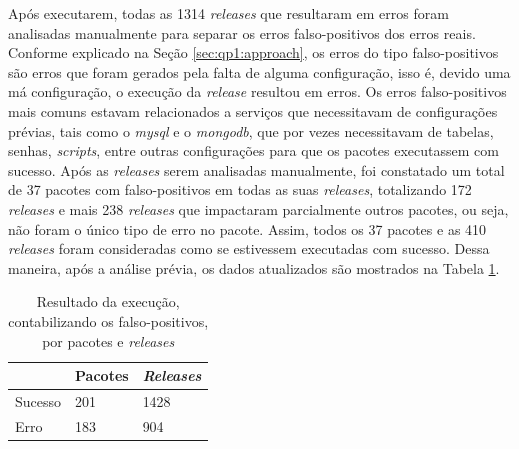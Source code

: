 Após executarem, todas as 1314 \textit{releases} que resultaram em erros foram analisadas manualmente para separar os erros falso-positivos dos erros reais. Conforme explicado na Seção \ref{sec:qp1:approach}, os erros do tipo falso-positivos são erros que foram gerados pela falta de alguma configuração, isso é, devido uma má configuração, o execução da \textit{release} resultou em erros. Os erros falso-positivos mais comuns estavam relacionados a serviços que necessitavam de configurações prévias, tais como o \textit{mysql} e o \textit{mongodb}, que por vezes necessitavam de tabelas, senhas, \textit{scripts}, entre outras configurações para que os pacotes executassem com sucesso. Após as \textit{releases} serem analisadas manualmente, foi constatado um total de 37 pacotes com falso-positivos em todas as suas \textit{releases}, totalizando 172 \textit{releases} e mais 238 \textit{releases} que impactaram parcialmente outros pacotes, ou seja, não foram o único tipo de erro no pacote. Assim, todos os 37 pacotes e as 410 \textit{releases} foram consideradas como se estivessem executadas com sucesso. Dessa maneira, após a análise prévia, os dados atualizados são mostrados na Tabela \ref{tab:res_rq1_2}.

\begin{table}[]
\centering
\begin{tabular}{|l|l|l|}
\hline
                    & Pacotes & \textit{Releases} \\ \hline
    Sucesso         & 201     & 1428     \\
    Erro            & 183     & 904     \\ \hline
\end{tabular}
\caption{Resultado da execução, contabilizando os falso-positivos, por pacotes e \textit{releases}}
\label{tab:res_rq1_2}
\end{table}

